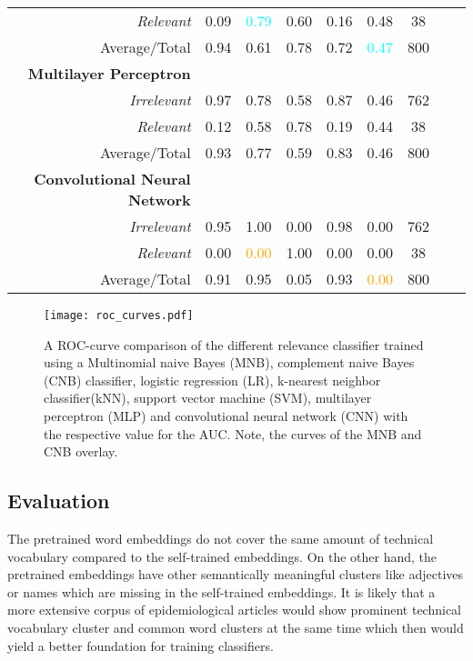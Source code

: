 \begin{table}[h!]
\begin{tabular}{@{}rcccccccc@{}}
      \textsl{Relevant}& 0.09& \textcolor{cyan}{0.79}& 0.60& 0.16& 0.48& 38 \\
      Average/Total& 0.94& 0.61& 0.78& 0.72& \textcolor{cyan}{0.47}& 800 \vspace{2mm}\\
      \textbf{Multilayer Perceptron}\\
      \textsl{Irrelevant}& 0.97& 0.78& 0.58& 0.87& 0.46& 762 \\
      \textsl{Relevant}& 0.12& 0.58& 0.78& 0.19& 0.44& 38 \\
      Average/Total& 0.93& 0.77& 0.59& 0.83& 0.46& 800 \\
      \textbf{Convolutional Neural Network}\\
      \textsl{Irrelevant}& 0.95& 1.00& 0.00& 0.98& 0.00& 762 \\
      \textsl{Relevant}& 0.00& \textcolor{orange}{0.00}& 1.00& 0.00& 0.00& 38 \\
      Average/Total& 0.91& 0.95& 0.05& 0.93& \textcolor{orange}{0.00}& 800 \\
      \bottomrule
    \end{tabular}
  \label{table:recommender_performance}
  \end{table}

  \begin{figure}[h!]
    \centering
    \texttt{[image: roc\_curves.pdf]}
    \caption{A ROC-curve comparison of the different relevance classifier trained using a Multinomial naive Bayes (MNB), complement naive Bayes (CNB) classifier, logistic regression (LR), k-nearest neighbor classifier(kNN), support vector machine (SVM), multilayer perceptron (MLP) and convolutional neural network (CNN) with the respective value for the AUC. Note, the curves of the MNB and CNB overlay.}
  \label{fig:roc}
  \end{figure}

\subsection{Evaluation}\label{eval_recommend}
  The pretrained word embeddings do not cover the same amount of technical vocabulary compared to the self-trained embeddings. On the other hand, the pretrained embeddings have other semantically meaningful clusters like adjectives or names which are missing in the self-trained embeddings.
  It is likely that a more extensive corpus of epidemiological articles would show prominent technical vocabulary cluster and common word clusters at the same time which then would yield a better foundation for training classifiers.


